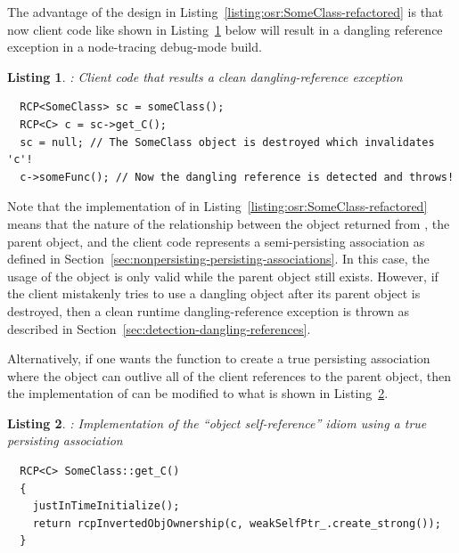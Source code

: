 \documentclass[pdf,ps2pdf,11pt]{SANDreport}
\newtheorem{listing}{Listing}
\begin{document}
The advantage of the design in
Listing~\ref{listing:osr:SomeClass-refactored} is that now client code
like shown in Listing~\ref{listing:osr:dangling-ref-SomeClass} below
will result in a dangling reference exception in a node-tracing
debug-mode build.


\begin{listing}: Client code that results a clean dangling-reference exception  \\
\label{listing:osr:dangling-ref-SomeClass}
{\small\begin{verbatim}
  RCP<SomeClass> sc = someClass();
  RCP<C> c = sc->get_C();
  sc = null; // The SomeClass object is destroyed which invalidates 'c'!
  c->someFunc(); // Now the dangling reference is detected and throws!
\end{verbatim}}
\end{listing}


Note that the implementation of {} in
Listing~\ref{listing:osr:SomeClass-refactored} means that the nature
of the relationship between the {} object returned from
{}, the parent {} object, and
the client code represents a semi-persisting association as defined in
Section~\ref{sec:nonpersisting-persisting-associations}.  In this
case, the usage of the {} object is only valid while the parent
{} object still exists.  However, if the client
mistakenly tries to use a dangling {} object after its parent
{} object is destroyed, then a clean runtime
dangling-reference exception is thrown as described in
Section~\ref{sec:detection-dangling-references}.

Alternatively, if one wants the {} function
to create a true persisting association where the {} object can
outlive all of the client references to the parent {}
object, then the implementation of {} can be
modified to what is shown in
Listing~\ref{listing:osr:SomeClass-get_C-persisting}.


\begin{listing}:  Implementation of the ``object self-reference'' idiom
using a true persisting association  \\
\label{listing:osr:SomeClass-get_C-persisting}
{\small\begin{verbatim}
  RCP<C> SomeClass::get_C()
  {
    justInTimeInitialize();
    return rcpInvertedObjOwnership(c, weakSelfPtr_.create_strong());
  }
\end{verbatim}}
\end{listing}
\end{document}
